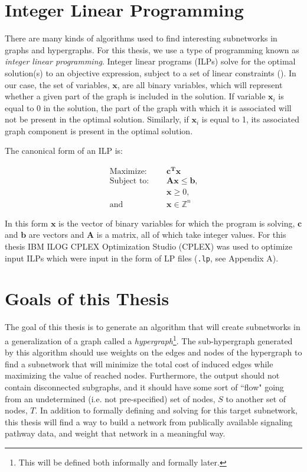 \documentclass[12pt,twoside]{reedthesis}
\theoremstyle{definition}
\begin{document}
 \section{Integer Linear Programming}

  There are many kinds of algorithms used to find interesting subnetworks in graphs and hypergraphs.  For this thesis, we use a type of programming known as \textit{integer linear programming}. Integer linear programs (ILPs) solve for the optimal solution(s) to an objective expression, subject to a set of linear constraints (\cite{Papadimitriou1998}). In our case, the set of variables, $\mathbf{x}$, are all binary variables, which will represent whether a given part of the graph is included in the solution. If variable $\mathbf{x}_i$ is equal to 0 in the solution, the part of the graph with which it is associated will not be present in the optimal solution. Similarly, if $\mathbf{x}_i$ is equal to 1, its associated graph component is present in the optimal solution.\par

  The canonical form of an ILP is:\par

  \begin{align}
    \text{Maximize: }\quad&\mathbf{c^Tx}\label{eq:obj_canonical}\\
    \text{Subject to: }\quad&\mathbf{Ax}\leq\mathbf{b}\text{,}\label{eq:constA}\\
    &\mathbf{x} \geq 0 \text{,}\label{eq:constB}\\
    \text{and } \quad & \mathbf{x} \in \mathbb{Z}^n \label{eq:constC}
  \end{align}

  In this form $\mathbf{x}$ is the vector of binary variables for which the program is solving, $\mathbf{c}$ and $\mathbf{b}$ are vectors and $\mathbf{A}$ is a matrix, all of which take integer values. For this thesis IBM ILOG CPLEX Optimization Studio (CPLEX) was used to optimize input ILPs which were input in the form of LP files (\texttt{.lp}, see Appendix A).

 \section{Goals of this Thesis}

 The goal of this thesis is to generate an algorithm that will create subnetworks in a generalization of a graph called a \textit{hypergraph}\footnote{This will be defined both informally and formally later.}. The sub-hypergraph generated by this algorithm should use weights on the edges and nodes of the hypergraph to find a subnetwork that will minimize the total cost of induced edges while maximizing the value of reached nodes. Furthermore, the output should not contain disconnected subgraphs, and it should have some sort of ``flow" going from an undetermined (i.e. not pre-specified) set of nodes, $S$ to another set of nodes, $T$. In addition to formally defining and solving for this target subnetwork, this thesis will find a way to build a network from publically available signaling pathway data, and weight that network in a meaningful way.\par
\end{document}
